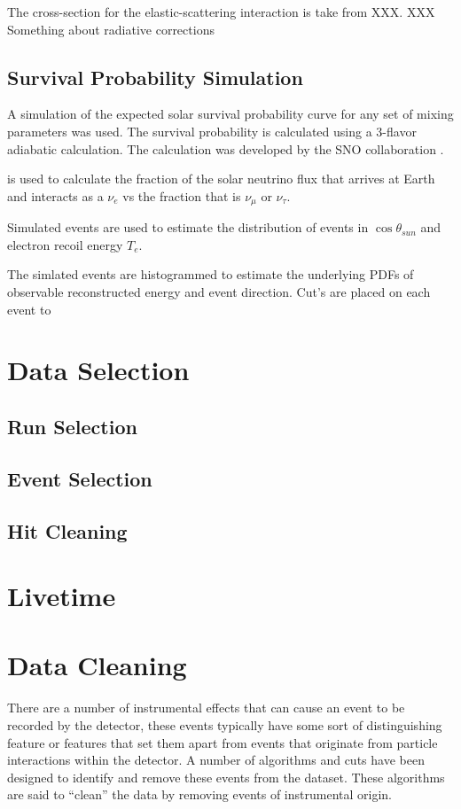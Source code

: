 The cross-section for the elastic-scattering interaction is take from
XXX.
XXX Something about radiative corrections

\subsection{Survival Probability Simulation}
A simulation of the expected solar survival probability curve for any set of mixing
parameters was used. The survival probability is calculated using a
3-flavor adiabatic calculation. The calculation was developed by the
SNO collaboration \cite{XXX}.

is used to calculate the fraction of the solar neutrino flux that arrives
at Earth and interacts as a $\nu_{e}$ vs the fraction that is $\nu_{\mu}$ or $\nu_{\tau}$.

Simulated events are used to estimate the distribution of events in $\cos\theta_{sun}$ and
electron recoil energy $T_{e}$.

The simlated events are histogrammed to estimate the underlying PDFs
of observable reconstructed energy and event direction. Cut's are placed
on each event to
\section{Data Selection}
\subsection{Run Selection}
\subsection{Event Selection}
\subsection{Hit Cleaning}

\section{Livetime}
\section{Data Cleaning}
There are a number of instrumental effects that can cause an event
to be recorded by the detector, these events typically have some
sort of distinguishing feature or features that set them apart
from events that originate from particle interactions within the
detector.
A number of algorithms and cuts have been designed to identify and remove
these events from the dataset.
These algorithms are said to ``clean'' the data by removing events
of instrumental origin.

